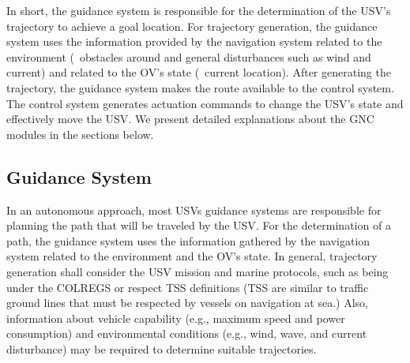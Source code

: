     In short, the guidance system is responsible for the determination of the \ac{USV}'s trajectory to achieve a goal location. For trajectory generation, the guidance system uses the information provided by the navigation system related to the environment (\eg~obstacles around and general disturbances such as wind and current) and related to the \ac{OV}'s state (\eg~current location). After generating the trajectory, the guidance system makes the route available to the control system. The control system generates actuation commands to change the \ac{USV}'s state and effectively move the \ac{USV}. We present detailed explanations about the \ac{GNC} modules in the sections below.
    
    \subsection{Guidance System}


    
    In an autonomous approach, most \acp{USV} guidance systems are responsible for planning the path that will be traveled by the \ac{USV}. For the determination of a path, the guidance system uses the information gathered by the navigation system related to the environment and the \ac{OV}'s state. In general, trajectory generation shall consider the \ac{USV} mission and marine protocols, such as being under the \ac{COLREGS} or respect \ac{TSS} definitions (\ac{TSS} are similar to traffic ground lines that must be respected by vessels on navigation at sea.) Also, information about vehicle capability (e.g., maximum speed and power consumption) and environmental conditions (e.g., wind, wave, and current disturbance) may be required to determine suitable trajectories.
    
